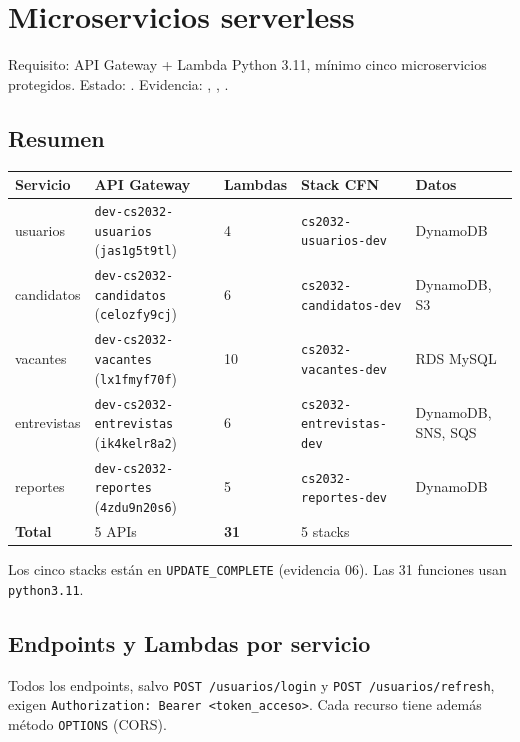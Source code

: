 \section{Microservicios serverless}
Requisito: API Gateway + Lambda Python 3.11, mínimo cinco microservicios protegidos. Estado: \cumple. Evidencia: , , .

\subsection{Resumen}
\begin{longtable}{p{2.3cm}p{2.7cm}p{1.6cm}p{2.2cm}p{4.2cm}}
\toprule
\textbf{Servicio} & \textbf{API Gateway} & \textbf{Lambdas} & \textbf{Stack CFN} & \textbf{Datos} \\
\midrule
\endhead
usuarios & \texttt{dev-cs2032-usuarios} (\texttt{jas1g5t9tl}) & 4 & \texttt{cs2032-usuarios-dev} & DynamoDB \\
candidatos & \texttt{dev-cs2032-candidatos} (\texttt{celozfy9cj}) & 6 & \texttt{cs2032-candidatos-dev} & DynamoDB, S3 \\
vacantes & \texttt{dev-cs2032-vacantes} (\texttt{lx1fmyf70f}) & 10 & \texttt{cs2032-vacantes-dev} & RDS MySQL \\
entrevistas & \texttt{dev-cs2032-entrevistas} (\texttt{ik4kelr8a2}) & 6 & \texttt{cs2032-entrevistas-dev} & DynamoDB, SNS, SQS \\
reportes & \texttt{dev-cs2032-reportes} (\texttt{4zdu9n20s6}) & 5 & \texttt{cs2032-reportes-dev} & DynamoDB \\
\midrule
\textbf{Total} & 5 APIs & \textbf{31} & 5 stacks & \\
\bottomrule
\end{longtable}
Los cinco stacks están en \texttt{UPDATE\_COMPLETE} (evidencia 06). Las 31 funciones usan \texttt{python3.11}.

\subsection{Endpoints y Lambdas por servicio}
Todos los endpoints, salvo \texttt{POST /usuarios/login} y \texttt{POST /usuarios/refresh}, exigen \texttt{Authorization: Bearer <token\_acceso>}. Cada recurso tiene además método \texttt{OPTIONS} (CORS).

